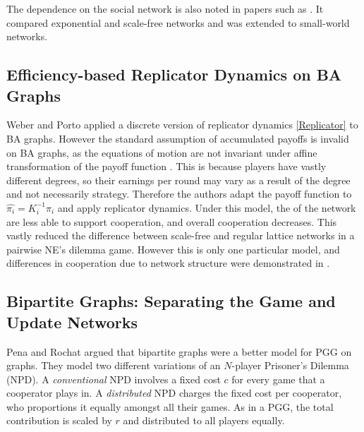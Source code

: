  \FloatBarrier
 \FloatBarrier
 
 
 The dependence on the social network is also noted in papers such as \cite{RN65}. It compared exponential and scale-free networks and was extended to small-world networks. \\
 
 \subsection{Efficiency-based Replicator Dynamics on BA Graphs}
 Weber and Porto \cite{RN77} applied a discrete version of replicator dynamics \eqref{Replicator} to BA graphs. However the standard assumption of accumulated payoffs is invalid on BA graphs, as the equations of motion are not invariant under affine transformation of the payoff function \cite{RN77}. This is because players have vastly different degrees, so their earnings per round may vary as a result of the degree and not necessarily strategy. Therefore the authors adapt the payoff function to $\hat{\pi_i} = K_i^{-1} \pi_i $ and apply replicator dynamics. Under this model, the  of the network are less able to support cooperation, and overall cooperation decreases. This vastly reduced the difference between scale-free and regular lattice networks in a pairwise NE's dilemma game. However this is only one particular model, and differences in cooperation due to network structure were demonstrated in \cite{RN62, RN44, RN43, RN28}.  \\
 
 
 \subsection{Bipartite Graphs: Separating the Game and Update Networks }
 


 Pena and Rochat \cite{RN48} argued that bipartite graphs were a better model for PGG on graphs. They model two different variations of an $N$-player Prisoner's Dilemma (NPD). A \emph{conventional} NPD involves a fixed cost $c$ for every game that a cooperator plays in. A \emph{distributed} NPD charges the fixed cost per cooperator, who proportions it equally amongst all their games. As in a PGG, the total contribution is scaled by $r$ and distributed to all players equally. \\
 
